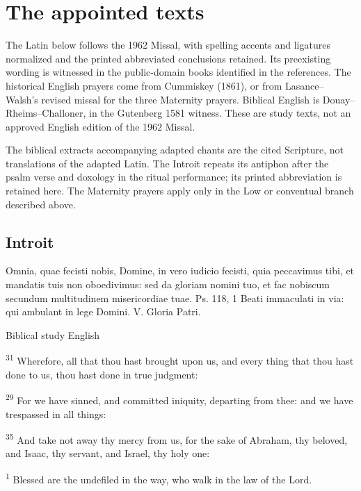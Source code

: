 \section{The appointed texts}
The Latin below follows the 1962 Missal, with spelling accents and ligatures
normalized and the printed abbreviated conclusions retained. Its preexisting
wording is witnessed in the public-domain books identified in the references.
The historical English prayers come from Cummiskey (1861), or from
Lasance--Walsh's revised missal for the three Maternity prayers.
Biblical English is Douay--Rheims--Challoner, in the Gutenberg 1581 witness.
These are study texts, not an approved English edition of the 1962 Missal.

The biblical extracts accompanying adapted chants are the cited Scripture,
not translations of the adapted Latin. The Introit repeats its antiphon
after the psalm verse and doxology in the ritual performance; its printed
abbreviation is retained here. The Maternity prayers apply only in the
Low or conventual branch described above.

\subsection{Introit}\label{proper-introit}


\begin{latinproper}
Omnia, quae fecisti nobis, Domine, in vero iudicio fecisti, quia peccavimus tibi, et mandatis tuis non oboedivimus: sed da gloriam nomini tuo, et fac nobiscum secundum multitudinem misericordiae tuae. Ps. 118, 1 Beati immaculati in via: qui ambulant in lege Domini. V. Gloria Patri.
\end{latinproper}

\begin{englishwitness}{Biblical study English}

\textsuperscript{31} Wherefore, all that thou hast brought upon us, and every thing that thou hast done to us, thou hast done in true judgment:

\textsuperscript{29} For we have sinned, and committed iniquity, departing from thee: and we have trespassed in all things:

\textsuperscript{35} And take not away thy mercy from us, for the sake of Abraham, thy beloved, and Isaac, thy servant, and Israel, thy holy one:

\textsuperscript{1} Blessed are the undefiled in the way, who walk in the law of the Lord.

\end{englishwitness}

